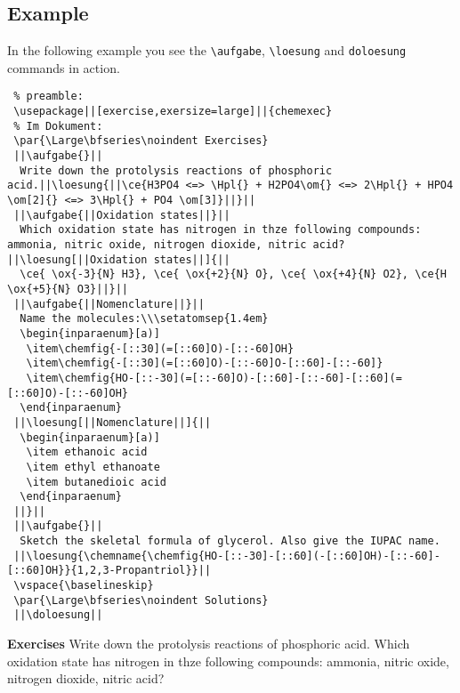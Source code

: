 \documentclass[DIV10]{scrartcl}
\begin{document}
\subsection{Example}
In the following example you see the \verb=\aufgabe=, \verb=\loesung= and \verb=doloesung= commands in action.
\begin{lstlisting}
 % preamble:
 \usepackage||[exercise,exersize=large]||{chemexec}
 % Im Dokument:
 \par{\Large\bfseries\noindent Exercises}
 ||\aufgabe{}||
  Write down the protolysis reactions of phosphoric acid.||\loesung{||\ce{H3PO4 <=> \Hpl{} + H2PO4\om{} <=> 2\Hpl{} + HPO4 \om[2]{} <=> 3\Hpl{} + PO4 \om[3]}||}||
 ||\aufgabe{||Oxidation states||}||
  Which oxidation state has nitrogen in thze following compounds: ammonia, nitric oxide, nitrogen dioxide, nitric acid?||\loesung[||Oxidation states||]{||
  \ce{ \ox{-3}{N} H3}, \ce{ \ox{+2}{N} O}, \ce{ \ox{+4}{N} O2}, \ce{H \ox{+5}{N} O3}||}||
 ||\aufgabe{||Nomenclature||}||
  Name the molecules:\\\setatomsep{1.4em}
  \begin{inparaenum}[a)]
   \item\chemfig{-[::30](=[::60]O)-[::-60]OH}
   \item\chemfig{-[::30](=[::60]O)-[::-60]O-[::60]-[::-60]}
   \item\chemfig{HO-[::-30](=[::-60]O)-[::60]-[::-60]-[::60](=[::60]O)-[::-60]OH}
  \end{inparaenum}
 ||\loesung[||Nomenclature||]{||
  \begin{inparaenum}[a)]
   \item ethanoic acid
   \item ethyl ethanoate
   \item butanedioic acid
  \end{inparaenum}
 ||}||
 ||\aufgabe{}||
  Sketch the skeletal formula of glycerol. Also give the IUPAC name.
 ||\loesung{\chemname{\chemfig{HO-[::-30]-[::60](-[::60]OH)-[::-60]-[::60]OH}}{1,2,3-Propantriol}}||
 \vspace{\baselineskip}
 \par{\Large\bfseries\noindent Solutions}
 ||\doloesung||
\end{lstlisting}
\newpage
\par{\Large\bfseries\noindent Exercises}
\aufgabe{}
 Write down the protolysis reactions of phosphoric acid.
 Which oxidation state has nitrogen in thze following compounds: ammonia, nitric oxide, nitrogen dioxide, nitric acid?
\end{document}
